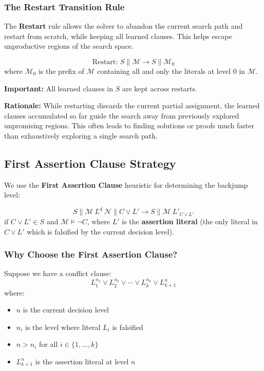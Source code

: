 \documentclass[11pt,a4paper]{article}
\theoremstyle{definition}
\theoremstyle{plain}
\theoremstyle{remark}
\begin{document}
\subsubsection{The Restart Transition Rule}

The \textbf{Restart} rule allows the solver to abandon the current search path and restart from scratch, while keeping all learned clauses. This helps escape unproductive regions of the search space.

\begin{tcolorbox}[colback=yellow!5!white,colframe=yellow!75!black,title=\textbf{Restart Transition Rule}]
\[
\text{Restart: } S \parallel \mathcal{M} \longrightarrow S \parallel \mathcal{M}_0
\]
where $\mathcal{M}_0$ is the prefix of $\mathcal{M}$ containing all and only the literals at level 0 in $\mathcal{M}$.

\textbf{Important:} All learned clauses in $S$ are kept across restarts.
\end{tcolorbox}

\textbf{Rationale:} While restarting discards the current partial assignment, the learned clauses accumulated so far guide the search away from previously explored unpromising regions. This often leads to finding solutions or proofs much faster than exhaustively exploring a single search path.

\subsection{First Assertion Clause Strategy}

We use the \textbf{First Assertion Clause} heuristic for determining the backjump level:

\begin{tcolorbox}[colback=blue!5!white,colframe=blue!75!black,title=\textbf{Backjump with First Assertion Clause}]
\[
S \parallel \mathcal{M}\ L^d\ \mathcal{N} \parallel C \lor L' \longrightarrow S \parallel \mathcal{M}\ L'_{C \lor L'}
\]
if $C \lor L' \in S$ and $\mathcal{M} \models \neg C$, where $L'$ is the \textbf{assertion literal} (the only literal in $C \lor L'$ which is falsified by the current decision level).
\end{tcolorbox}

\subsubsection{Why Choose the First Assertion Clause?}

Suppose we have a conflict clause:
\[
L_1^{n_1} \lor L_2^{n_2} \lor \cdots \lor L_k^{n_k} \lor L_{k+1}^n
\]
where:
\begin{itemize}
    \item $n$ is the current decision level
    \item $n_i$ is the level where literal $L_i$ is falsified
    \item $n > n_i$ for all $i \in \{1, \ldots, k\}$
    \item $L_{k+1}^n$ is the assertion literal at level $n$
\end{itemize}
\end{document}
